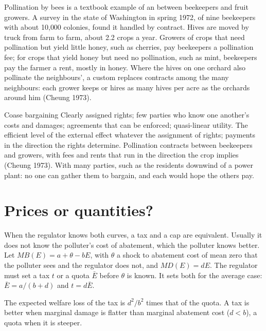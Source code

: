 \begin{record}
Pollination by bees is a textbook example of an  between beekeepers and fruit growers. A survey in the state of
Washington in spring 1972, of nine beekeepers with about 10{,}000 colonies, found it handled by contract. Hives are moved by
truck from farm to farm, about 2.2 crops a year. Growers of crops that need pollination but yield little honey, such as
cherries, pay beekeepers a pollination fee; for crops that yield honey but need no pollination, such as mint, beekeepers pay
the farmer a rent, mostly in honey. Where the hives on one orchard also pollinate the neighbours', a custom replaces
contracts among the many neighbours: each grower keeps or hires as many hives per acre as the orchards around him (Cheung
1973).
\end{record}

\begin{model}{Coase bargaining}
\assumes Clearly assigned rights; few parties who know one another's costs and damages; agreements that can be enforced;
quasi-linear utility.
\predicts The efficient level of the external effect whatever the assignment of rights; payments in the direction the
rights determine.
\tested Pollination contracts between beekeepers and growers, with fees and rents that run in the direction the crop
implies (Cheung 1973).
\breaks With many parties, such as the residents downwind of a power plant: no one can gather them to bargain, and each
would hope the others pay.
\end{model}

\section{Prices or quantities?}\label{sec:b2:externalities-and-public-goods-theory:weitzman}

When the regulator knows both curves, a tax and a cap are equivalent. Usually it does not know the polluter's cost of
abatement, which the polluter knows better. Let $\mathit{MB}(E) = a + \theta - bE$, with $\theta$ a shock to abatement cost of mean zero that the
polluter sees and the regulator does not, and $\mathit{MD}(E) = dE$. The regulator must set a tax $t$ or a quota $\bar E$ before $\theta$ is known. It
sets both for the average case: $\bar E = a/(b + d)$ and $t = d\bar E$.

\begin{proposition}\label{prop:b2:externalities-and-public-goods-theory:slopes}
The expected welfare loss of the tax is $d^2/b^2$ times that of the quota. A tax is better when marginal damage is flatter
than marginal abatement cost ($d < b$), a quota when it is steeper.
\end{proposition}

